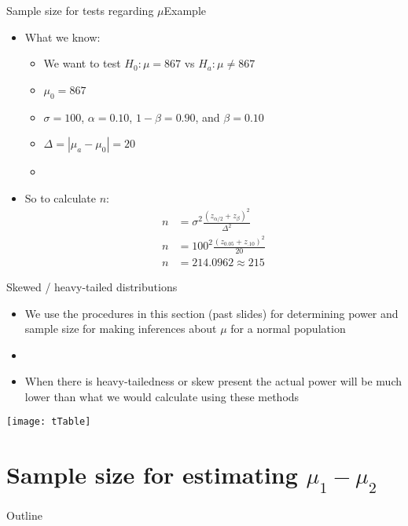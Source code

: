 \documentclass[xcolor=dvipsnames]{beamer}
\begin{document}
\begin{frame}{Sample size for tests regarding $\mu$}{Example}
	\begin{itemize}
		\item What we know:
		\begin{itemize}
			\item We want to test $H_0: \mu = 867$ vs $H_a: \mu \neq 867$
			\item $\mu_0 = 867$
			\item $\sigma = 100$, $\alpha = 0.10$, $1-\beta = 0.90$, and $\beta = 0.10$
			\item $\Delta = |\mu_a - \mu_0| = 20$
			\item[]
		\end{itemize}
		\item So to calculate $n$:
		\begin{align*}
			n &= \sigma^2\frac{(z_{\alpha/2} + z_{\beta})^2}{\Delta^2} \\
			n &= 100^2\frac{(z_{0.05} + z_{.10})^2}{20} \\
			n &= 214.0962 \approx 215
		\end{align*}
	\end{itemize}
\end{frame}

\begin{frame}{Skewed / heavy-tailed distributions}
	\begin{itemize}
		\item We use the procedures in this section (past slides) for determining power and sample size for making inferences about $\mu$ for a normal population
		\item[]
		\item When there is heavy-tailedness or skew present the actual power will be much lower than what we would calculate using these methods
	\end{itemize}
\begin{center}
	\texttt{[image: tTable]}
\end{center}
\end{frame}

\section{Sample size for estimating $\mu_1 - \mu_2$}
\begin{frame}{Outline}
	\tableofcontents[currentsection,subsectionstyle=show/shaded/hide]
\end{frame}
\end{document}
